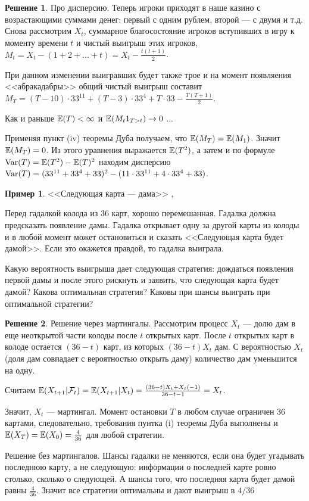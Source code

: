 \documentclass[pdftex,12pt,a4paper]{article}
\numberwithin{equation}{page} %
\theoremstyle{definition} %
\theoremstyle{definition}
\newtheorem{example}[equation]{Пример}
\theoremstyle{definition}
\newtheorem*{solution}{Решение}
\theoremstyle{definition}
\begin{document}
\begin{solution}
Про дисперсию. Теперь игроки приходят в наше казино с возрастающими суммами денег: первый с одним рублем, второй --- с двумя и т.д. Снова рассмотрим $X_{t}$, суммарное благосостояние игроков вступивших в игру к моменту времени $t$ и чистый выигрыш этих игроков, $M_{t}=X_{t}-(1+2+...+t)=X_{t}-\frac{t(t+1)}{2}$.

При данном изменении выигравших будет также трое и на момент появляения <<абракадабры>> общий чистый выигрыш составит $M_{T}=(T-10)\cdot 33^{11}+(T-3)\cdot 33^{4}+T\cdot 33-\frac{T(T+1)}{2}$.

Как и раньше $\mathbb{E}(T)<\infty$ и $\mathbb{E}(M_{t}1_{T>t})\rightarrow 0$ ...

Применяя пункт (iv) теоремы Дуба получаем, что $\mathbb{E}(M_{T})=\mathbb{E}(M_{1})$. Значит $\mathbb{E}(M_{T})=0$. Из этого уравнения выражается $\mathbb{E}(T^{2})$, а затем и по формуле $\operatorname{Var}(T)=\mathbb{E}(T^{2})-\mathbb{E}(T)^{2}$ находим дисперсию $\operatorname{Var}(T)=(33^{11}+33^{4}+33)^{2}-(11\cdot 33^{11}+4\cdot 33^{4}+ 33)$.
\end{solution}

\begin{example} <<Следующая карта --- дама>> \cite{morters:m}, \cite{winkler:gpdp}

Перед гадалкой колода из 36 карт, хорошо перемешанная. Гадалка
должна предсказать появление дамы. Гадалка открывает
одну за другой карты из колоды и в любой момент может остановиться
и сказать <<Следующая карта будет дамой>>. Если это окажется правдой, то гадалка выиграла. 

Какую вероятность выигрыша дает следующая стратегия: дождаться появления первой дамы и после этого рискнуть и заявить, что следующая карта будет дамой? Какова оптимальная стратегия? Каковы при шансы выиграть при оптимальной стратегии?
\end{example}

\begin{solution}
Решение через мартингалы. Рассмотрим процесс $X_{t}$ --- долю дам в еще неоткрытой части колоды после $t$ открытых карт. После $t$ открытых карт в колоде остается $(36-t)$ карт, из которых $(36-t)X_{t}$ дам. С вероятностью $X_{t}$ (доля дам совпадает с вероятностью открыть даму) количество дам уменьшится на одну.

Считаем $\mathbb{E}(X_{t+1}|\mathcal{F}_{t})=\mathbb{E}(X_{t+1}|X_{t})=\frac{(36-t)X_{t}+X_{t}(-1)}{36-t-1}=X_{t}$.

Значит, $X_{t}$ --- мартингал. Момент остановки $T$ в любом случае ограничен 36 картами, следовательно, требования пунтка (i) теоремы Дуба выполнены и $\mathbb{E}(X_{T})=\mathbb{E}(X_{0})=\frac{4}{36}$ для любой стратегии.

Решение без мартингалов. Шансы гадалки не меняются, если она будет угадывать последнюю карту, а не следующую: информации о последней карте ровно столько, сколько о следующей. А шансы того, что последняя карта будет дамой равны $\frac{4}{36}$.
Значит все стратегии оптимальны и дают выигрыш в $4/36$
\end{solution}
\end{document}
